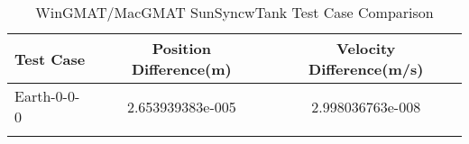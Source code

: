 \begin{table}[htbp!]
\centering
\caption{ WinGMAT/MacGMAT SunSyncwTank Test Case Comparison}
      \begin{tabular}{lcc}
      \hline\hline
          Test Case & Position Difference(m) & Velocity Difference(m/s) \\
         \hline
         Earth-0-0-0 & 2.653939383e-005 & 2.998036763e-008 \\
      \hline\hline
      \label{Table: SunSyncwTank WinGMAT-MacGMAT Table} 
\end{tabular}
\end{table}
